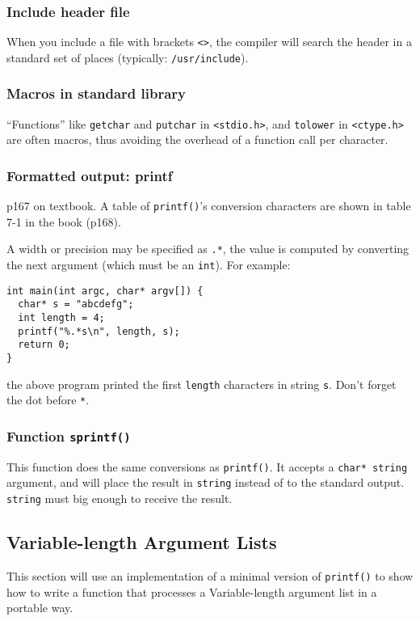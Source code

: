 \documentclass[11pt]{article}
\begin{document}
\subsubsection{Include header file}
\label{sec:org5c53812}
When you include a file with brackets \texttt{<>}, the compiler will search the header in a standard set of places (typically: \texttt{/usr/include}).

\subsubsection{Macros in standard library}
\label{sec:org09847f8}
``Functions'' like \texttt{getchar} and \texttt{putchar} in \texttt{<stdio.h>}, and \texttt{tolower} in \texttt{<ctype.h>} are often macros, thus avoiding the overhead of a function call per character.

\subsubsection{Formatted output: printf}
\label{sec:orgdf7e088}
p167 on textbook. A table of \texttt{printf()}'s conversion characters are shown in table 7-1 in the book (p168).

A width or precision may be specified as \texttt{.*}, the value is computed by converting the next argument (which must be an \texttt{int}). For example:
\begin{verbatim}
int main(int argc, char* argv[]) {
  char* s = "abcdefg";
  int length = 4;
  printf("%.*s\n", length, s);
  return 0;
}
\end{verbatim}
the above program printed the first \texttt{length} characters in string \texttt{s}. Don't forget the dot before \texttt{*}.

\subsubsection{Function \texttt{sprintf()}}
\label{sec:org66710e8}
This function does the same conversions as \texttt{printf()}. It accepts a \texttt{char* string} argument, and will place the result in \texttt{string} instead of to the standard output. \texttt{string} must big enough to receive the result.

\subsection{Variable-length Argument Lists}
\label{sec:org7ed4cd9}
This section will use an implementation of a minimal version of \texttt{printf()} to show how to write a function that processes a Variable-length argument list in a portable way.
\end{document}
